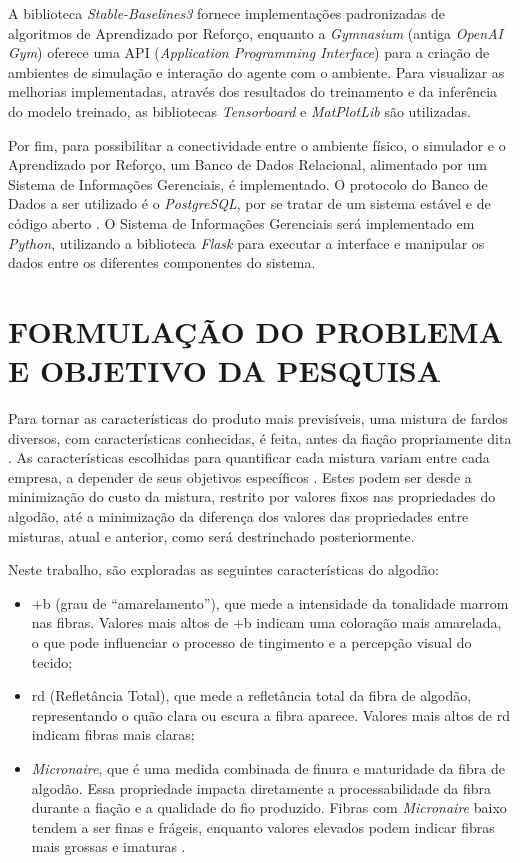 \documentclass[
    12pt,                %
    openright,           %
    oneside,             %
    a4paper,             %
    english,             %
    spanish,             %
    brazil               %
]{ufscar}
\begin{document}
A biblioteca \textit{Stable-Baselines3} fornece implementações padronizadas de algoritmos de Aprendizado por Reforço, enquanto a \textit{Gymnasium} (antiga \textit{OpenAI Gym}) oferece uma API (\textit{Application Programming Interface}) para a criação de ambientes de simulação e interação do agente com o ambiente. Para visualizar as melhorias implementadas, através dos resultados do treinamento e da inferência do modelo treinado, as bibliotecas \textit{Tensorboard} e \textit{MatPlotLib} são utilizadas.

Por fim, para possibilitar a conectividade entre o ambiente físico, o simulador e o Aprendizado por Reforço, um Banco de Dados Relacional, alimentado por um Sistema de Informações Gerenciais, é implementado. O protocolo do Banco de Dados a ser utilizado é o \textit{PostgreSQL}, por se tratar de um sistema estável e de código aberto \cite{PostgreSQL}. O Sistema de Informações Gerenciais será implementado em \textit{Python}, utilizando a biblioteca \textit{Flask} para executar a interface e manipular os dados entre os diferentes componentes do sistema.

\section{FORMULAÇÃO DO PROBLEMA E OBJETIVO DA PESQUISA}

Para tornar as características do produto mais previsíveis, uma mistura de fardos diversos, com características conhecidas, é feita, antes da fiação propriamente dita \cite{zago_2005}. As características escolhidas para quantificar cada mistura variam entre cada empresa, a depender de seus objetivos específicos \cite{camargo2012}. Estes podem ser desde a minimização do custo da mistura, restrito por valores fixos nas propriedades do algodão, até a minimização da diferença dos valores das propriedades entre misturas, atual e anterior, como será destrinchado posteriormente.

Neste trabalho, são exploradas as seguintes características do algodão: 
\begin{itemize}
    \item {+b} (grau de “amarelamento”), que mede a intensidade da tonalidade marrom nas fibras. Valores mais altos de +b indicam uma coloração mais amarelada, o que pode influenciar o processo de tingimento e a percepção visual do tecido; 
    \item {rd} (Refletância Total), que mede a refletância total da fibra de algodão, representando o quão clara ou escura a fibra aparece. Valores mais altos de rd indicam fibras mais claras; 
    \item {\textit{Micronaire}}, que é uma medida combinada de finura e maturidade da fibra de algodão. Essa propriedade impacta diretamente a processabilidade da fibra durante a fiação e a qualidade do fio produzido. Fibras com \textit{Micronaire} baixo tendem a ser finas e frágeis, enquanto valores elevados podem indicar fibras mais grossas e imaturas \cite{fang_physical_2018}.
\end{itemize}
\end{document}

